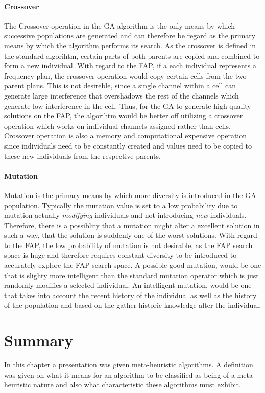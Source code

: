 \paragraph{Crossover}
The Crossover operation in the GA algorithm is the only means by which successive populations are generated and can therefore be regard as the primary means by which the algorithm performs its search. As the crossover is defined in the standard algorihtm, certain parts of both parents are copied and combined to form a new individual. With regard to the FAP, if a each individual represents a frequency plan, the crossover operation would copy certain cells from the two parent plans. This is not desireble, since a single channel within a cell can generate large interference that overshadows the rest of the channels which generate low interference in the cell. Thus, for the GA to generate high quality solutions on the FAP, the algorihtm would be better off utilizing a crossover operation which works on individual channels assigned rather than cells. Crossover operation is also a memory and computational expensive operation since individuals need to be constantly created and values need to be copied to these new individuals from the respective parents.
\paragraph{Mutation}
Mutation is the primary means by which more diversity is introduced in the GA population. Typically the mutation value is set to a low probability due to mutation actually \emph{modifying} individuals and not introducing \emph{new} individuals. Therefore, there is a possiblity that a mutation might alter a excellent solution in such a way, that the solution is suddenly one of the worst solutions. With regard to the FAP, the low probability of mutation is not desirable, as the FAP search space is huge and therefore requires constant diversity to be introduced to accurately explore the FAP search space. A possible good mutation, would be one that is slighty more intelligent than the standard mutation operator which is just randomly modifies a selected individual. An intelligent mutation, would be one that takes into account the recent history of the individual as well as the history of the population and based on the gather historic knowledge alter the individual.
\section {Summary}
In this chapter a presentation was given meta-heuristic algorithms. A definition was given on what it means for an algorithm to be classified as being of a meta-heuristic nature and also what characteristic these algorithms must exhibit.


